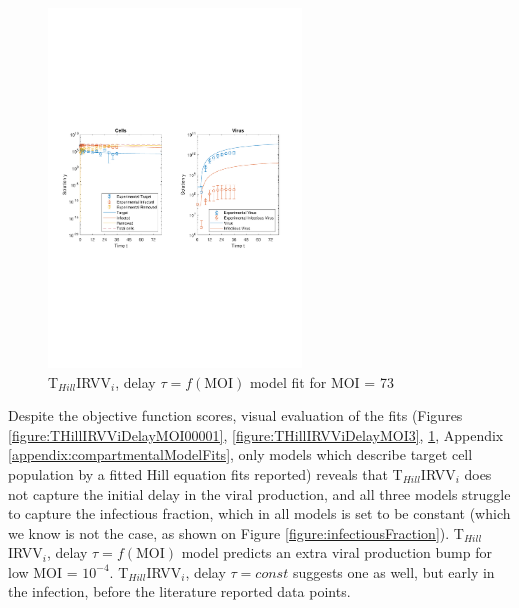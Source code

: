 \begin{figure}[H]
\begin{center}
\includegraphics[width=0.6\textwidth, trim={1cm 9.5cm 1cm 9.5cm}, clip]{D_chapters/6_appendix/4_THillIRVViDelay/ModelTHillIRVViDelayDSNSaenz2010FittedMOI73B0.0010133D0.55548P3247.2256C0.0027335TIC1896440.1965TH4.9813iFrac0.11736log.pdf}
\caption[T$_{Hill}$IRVV$_i$, delay $\tau = f(\text{MOI})$ model fit for MOI = 73]%
{T$_{Hill}$IRVV$_i$, delay $\tau = f(\text{MOI})$ model fit for MOI = 73}
\label{figure:THillIRVViDelayMOI73}
\end{center}
\end{figure}

Despite the objective function scores, visual evaluation of the fits (Figures \ref{figure:THillIRVViDelayMOI00001}, \ref{figure:THillIRVViDelayMOI3}, \ref{figure:THillIRVViDelayMOI73}, Appendix \ref{appendix:compartmentalModelFits}, only models which describe target cell population by a fitted Hill equation fits reported) reveals that T$_{Hill}$IRVV$_i$ does not capture the initial delay in the viral production, and all three models struggle to capture the infectious fraction, which in all models is set to be constant (which we know is not the case, as shown on Figure \ref{figure:infectiousFraction}). T$_{Hill}$IRVV$_i$, delay $\tau = f(\text{MOI})$ model predicts an extra viral production bump for low MOI = $10^{-4}$. T$_{Hill}$IRVV$_i$, delay $\tau = const$ suggests one as well, but early in the infection, before the literature reported data points.

